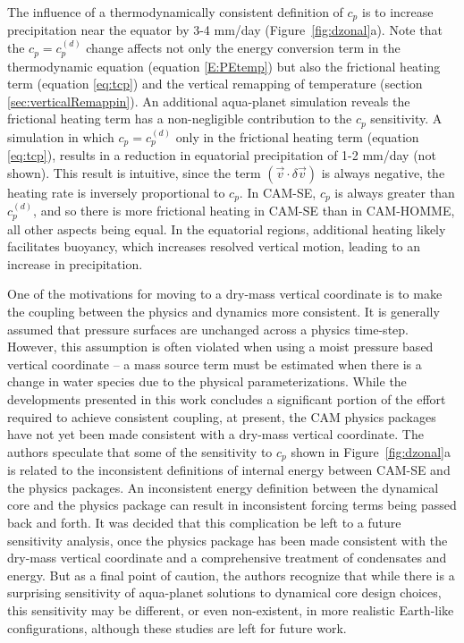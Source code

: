 \documentclass{agujournal}
\begin{document}
{The influence of a thermodynamically consistent definition of $c_p$ is to increase precipitation near the equator by 3-4 mm/day (Figure~\ref{fig:dzonal}a). Note that the $c_p=c_p^{(d)}$ change affects not only the energy conversion term in the thermodynamic equation (equation \eqref{E:PEtemp}) but also the frictional heating term (equation \eqref{eq:tcp}) and the vertical remapping of temperature (section \ref{sec:verticalRemappin}). An additional aqua-planet simulation reveals the frictional heating term has a non-negligible contribution to the $c_p$ sensitivity. A simulation in which $c_p = c_p^{(d)}$ only in the frictional heating term (equation \eqref{eq:tcp}), results in a reduction in equatorial precipitation of 1-2 mm/day (not shown). This result is intuitive, since the term $\left(\vec{v}\cdot \delta \vec{v}\right)$ is always negative, the heating rate is inversely proportional to $c_p$. In CAM-SE, $c_p$ is always greater than $c_p^{(d)}$, and so there is more frictional heating in CAM-SE than in CAM-HOMME, all other aspects being equal. In the equatorial regions, additional heating likely facilitates buoyancy, which increases resolved vertical motion, leading to an increase in precipitation. 

One of the motivations for moving to a dry-mass vertical coordinate is to make the coupling between the physics and dynamics more consistent. It is generally assumed that pressure surfaces are unchanged across a physics time-step. However, this assumption is often violated when using a moist pressure based vertical coordinate -- a mass source term must be estimated when there is a change in water species due to the physical parameterizations. While the developments presented in this work concludes a significant portion of the effort required to achieve consistent coupling, at present, the CAM physics packages have not yet been made consistent with a dry-mass vertical coordinate. The authors speculate that some of the sensitivity to $c_p$ shown in Figure~\ref{fig:dzonal}a is related to the inconsistent definitions of internal energy between CAM-SE and the physics packages. An inconsistent energy definition between the dynamical core and the physics package can result in inconsistent forcing terms being passed back and forth. It was decided that this complication be left to a future sensitivity analysis, once the physics package has been made consistent with the dry-mass vertical coordinate and a comprehensive treatment of condensates and energy. But as a final point of caution, the authors recognize that while there is a surprising sensitivity of aqua-planet solutions to dynamical core design choices, this sensitivity may be different, or even non-existent, in more realistic Earth-like configurations, although these studies are left for future work.

}
\end{document}
